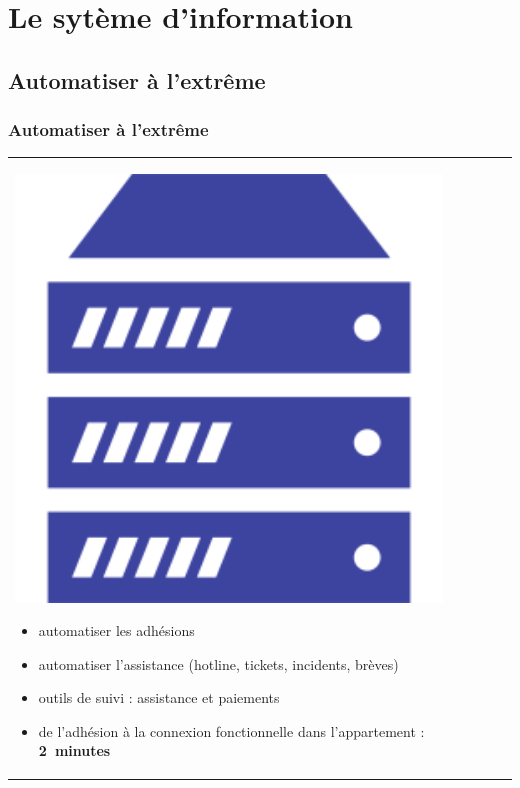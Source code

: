 \documentclass[handout]{beamer}
\begin{document}
	\section{Le sytème d'information}

	\subsection{Automatiser à l'extrême}
		\begin{frame}
		\frametitle{Automatiser à l'extrême}
		\begin{tabular}{l l}
			\begin{minipage}{0.2\textwidth}
				\begin{center}
					\includegraphics[width=0.9\textwidth]{images/serveur.png}
				\end{center}
			\end{minipage}

			\begin{minipage}{0.8\textwidth}
				\begin{itemize}
					\item automatiser les adhésions
					\item automatiser l'assistance (hotline, tickets, incidents, brèves)
					\item outils de suivi : assistance et paiements
					\item de l'adhésion à la connexion fonctionnelle dans l'appartement : \mbox{\textbf{2 minutes}}
				\end{itemize}
			\end{minipage}
			
		\end{tabular}
		\end{frame}


\end{document}
